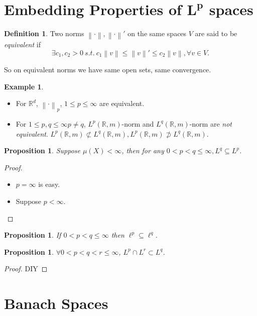 \documentclass{report}
\newcommand{\R}{\mathbb{R}}
\newcommand{\st}{\ s.t.\ }
\newcommand{\norm}[1]{\left\| #1 \right\|}
\newtheorem{proposition}[theorem]{Proposition}
\theoremstyle{definition}
\newtheorem{definition}[theorem]{Definition}
\newtheorem{example}[theorem]{Example}
\theoremstyle{remark}
\newcommand{\fnl}{\parbox[t]{0\linewidth}{}}
\newcommand*\ttlmath[2]{\texorpdfstring{$\boldsymbol{#1}$}{#2}}
\begin{document}
\section{Embedding Properties of \ttlmath{L^p}{L\textasciicircum p} spaces}
\begin{definition}
	Two norms $\norm{\cdot}, \norm{\cdot}'$ on the same spaces $V$ are said to be \emph{equivalent} if \[\exists c_1, c_2 > 0 \st c_1\norm{v} \leq \norm{v}' \leq c_2 \norm{v}, \forall v \in V.\]
\end{definition}
So on equivalent norms we have same open sets, same convergence.
\begin{example} \fnl
	\begin{itemize}
		\item For $\R^d$, $\norm{\cdot}_p$, $1 \leq p \leq \infty$ are equivalent.
		\item For $1 \leq p, q \leq \infty p \neq q$, $L^p(\R, m)$-norm and $L^q(\R, m)$-norm are \emph{not equivalent}. $L^p(\R, m) \not\subset L^q(\R, m), L^p(\R, m) \not\supset L^q(\R, m)$.
	\end{itemize}
\end{example}

\begin{proposition}
	Suppose $\mu(X) < \infty$, then for any $0 < p < q \leq \infty, L^q \subseteq L^p$.
\end{proposition}
\begin{proof}
	\begin{itemize}
		\item $p = \infty$ is easy.
		\item Suppose $p < \infty$.
	\end{itemize}
\end{proof}

\begin{proposition}
	If $0 < p < q \leq \infty$ then $\ell^p \subseteq \ell^q$.
\end{proposition}


\begin{proposition}
	$\forall 0 < p < q < r \leq \infty$, $L^p \cap L^r \subset L^q$.
\end{proposition}
\begin{proof}
	DIY
\end{proof}

\section{Banach Spaces}
\end{document}
